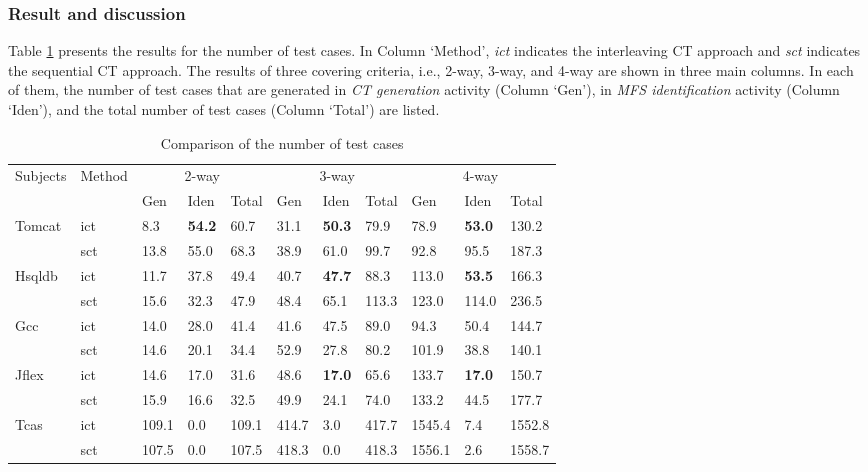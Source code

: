 \documentclass[journal,12pt,onecolumn,draftclsnofoot,]{IEEEtran}
\begin{document}




\subsubsection{Result and discussion}
Table \ref{cm_elda_fglt_test} presents the results for the number of test cases. In Column `Method', \emph{ict} indicates the interleaving CT approach and \emph{sct} indicates the sequential CT approach. The results of three covering criteria, i.e., 2-way, 3-way, and 4-way are shown in three main columns. In each of them, the number of test cases that are generated in \emph{CT generation} activity (Column `Gen'), in \emph{MFS identification} activity (Column `Iden'), and the total number of test cases (Column `Total') are listed.

\begin{table}[ht]
\centering
\caption{Comparison of the number of test cases}
\label{cm_elda_fglt_test}
\begin{tabular}{|ll|lll|lll|lll|}
\hline
\multirow{2}{*}{Subjects} & \multirow{2}{*}{Method} & \multicolumn{3}{c|}{2-way} & \multicolumn{3}{c|}{3-way} & \multicolumn{3}{c|}{4-way} \\ \cline{3-11}
                          &                         &Gen  & Iden & Total  &  Gen  & Iden & Total  & Gen  & Iden & Total   \\ \hline
Tomcat	&ict	&8.3	&\textbf{54.2}	&60.7	&31.1	&\textbf{50.3}	&79.9	&78.9	&\textbf{53.0}	&130.2	\\
	&sct	&13.8	&55.0	&68.3	&38.9	&61.0	&99.7	&92.8	&95.5	&187.3	\\\hline
Hsqldb	&ict	&11.7	&37.8	&49.4	&40.7	&\textbf{47.7}	&88.3	&113.0	&\textbf{53.5}	&166.3	\\
	&sct	&15.6	&32.3	&47.9	&48.4	&65.1	&113.3	&123.0	&114.0	&236.5	\\\hline
Gcc	&ict	&14.0	&28.0	&41.4	&41.6	&47.5	&89.0	&94.3	&50.4	&144.7	\\
	&sct	&14.6	&20.1	&34.4	&52.9	&27.8	&80.2	&101.9	&38.8	&140.1	\\\hline
Jflex	&ict	&14.6	&17.0	&31.6	&48.6	&\textbf{17.0}	&65.6	&133.7	&\textbf{17.0}	&150.7	\\
	&sct	&15.9	&16.6	&32.5	&49.9	&24.1	&74.0	&133.2	&44.5	&177.7	\\\hline
Tcas	&ict	&109.1	&0.0	&109.1	&414.7	&3.0	&417.7	&1545.4	&7.4	&1552.8	\\
	&sct	&107.5	&0.0	&107.5	&418.3	&0.0	&418.3	&1556.1	&2.6	&1558.7	\\\hline
\end{tabular}
\end{table}
\end{document}
